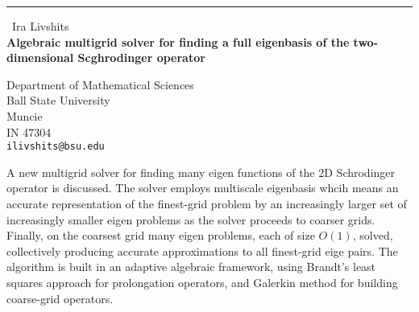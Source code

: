 \documentclass{report}
\begin{document}
\begin{center}
\rule{6in}{1pt} \
{\large Ira Livshits \\
{\bf Algebraic multigrid solver for finding a full eigenbasis of the two-dimensional Scghrodinger operator}}

Department of Mathematical Sciences \\ Ball State University \\ Muncie \\ IN 47304
\\
{\tt ilivshits@bsu.edu}\end{center}

A new multigrid solver for finding many eigen functions of the 2D
Schrodinger operator is discussed. The solver employs multiscale
eigenbasis whcih means an accurate representation of the finest-grid
problem by an increasingly larger set of increasingly smaller eigen
problems as the solver proceeds to coarser grids.
Finally, on the coarsest grid many eigen problems, each of size $O(1)$,
solved, collectively producing accurate approximations to all finest-grid
eige pairs. The algorithm is built in an adaptive algebraic framework,
using Brandt's least squares approach for prolongation operators, and
Galerkin method for building coarse-grid operators.
\end{document}

